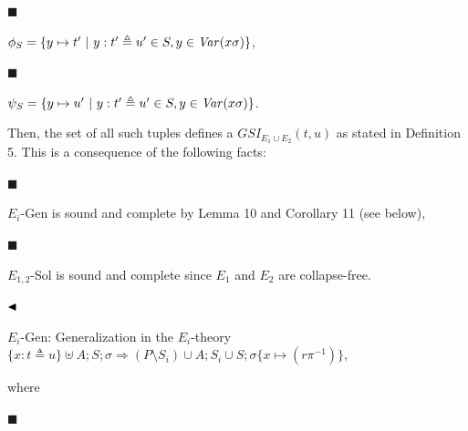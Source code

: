 \par\noindent  $\blacksquare$ 
 
$\phi_{S}=\{y\mapsto t^{\prime}\leavevmode\nobreak\ |\leavevmode\nobreak\ y:t^{\prime}\triangleq u^{\prime}\in S,y\in\mathit{Var}(x\sigma)\}$,\par
 
 
 
\par\noindent  $\blacksquare$ 
 
$\psi_{S}=\{y\mapsto u^{\prime}\leavevmode\nobreak\ |\leavevmode\nobreak\ y:t^{\prime}\triangleq u^{\prime}\in S,y\in\mathit{Var}(x\sigma)\}$.\par
 
 
  
Then, the set of all such tuples defines a $GSI_{E_{1}\cup E_{2}}(t,u)$ as stated in Definition 5. This is a consequence of the following facts:\par
  
\par\noindent  $\blacksquare$ 
 
${E_{i}}$-Gen is sound and complete by Lemma 10 and Corollary 11 (see below),\par
 
 
 
\par\noindent  $\blacksquare$ 
 
$E_{1,2}$-Sol is sound and complete since $E_{1}$ and $E_{2}$ are collapse-free.\par
 
 
  
$\hfill\blacktriangleleft$\par
 
 
    
\par
 
$E_{i}$-Gen: Generalization in the $E_{i}$-theory  $\{x:t\triangleq u\}\uplus A;S;\sigma\Longrightarrow(P\setminus S_{i})\cup A;S_{i}\cup S;\sigma\{x\mapsto(r\pi^{-1})\},$\par
     
where\par
     
\par\noindent  $\blacksquare$ 
 
